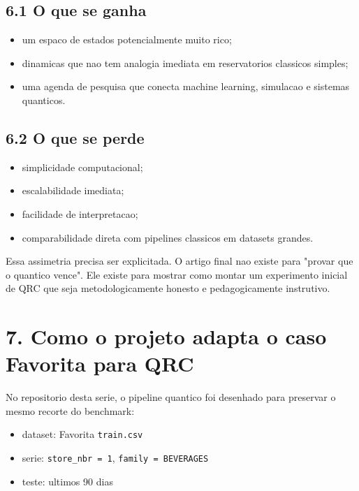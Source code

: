 \documentclass[12pt]{article}
\providecommand{\tightlist}{%
  \setlength{\itemsep}{0pt}\setlength{\parskip}{0pt}}
\begin{document}
\subsection{6.1 O que se ganha}\label{61-o-que-se-ganha}

\begin{itemize}
\tightlist
\item
  um espaco de estados potencialmente muito rico;
\item
  dinamicas que nao tem analogia imediata em reservatorios classicos simples;
\item
  uma agenda de pesquisa que conecta machine learning, simulacao e sistemas quanticos.
\end{itemize}

\subsection{6.2 O que se perde}\label{62-o-que-se-perde}

\begin{itemize}
\tightlist
\item
  simplicidade computacional;
\item
  escalabilidade imediata;
\item
  facilidade de interpretacao;
\item
  comparabilidade direta com pipelines classicos em datasets grandes.
\end{itemize}

Essa assimetria precisa ser explicitada. O artigo final nao existe para "provar que o quantico vence". Ele existe para mostrar como montar um experimento inicial de QRC que seja metodologicamente honesto e pedagogicamente instrutivo.

\section{7. Como o projeto adapta o caso Favorita para QRC}\label{7-como-o-projeto-adapta-o-caso-favorita-para-qrc}

No repositorio desta serie, o pipeline quantico foi desenhado para preservar o mesmo recorte do benchmark:

\begin{itemize}
\tightlist
\item
  dataset: Favorita \texttt{train.csv}
\item
  serie: \texttt{store\_nbr\ =\ 1}, \texttt{family\ =\ BEVERAGES}
\item
  teste: ultimos 90 dias
\end{itemize}
\end{document}
